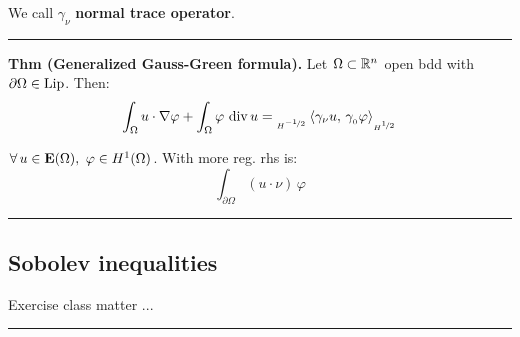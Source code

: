 We call $\gamma_\nu$ \textbf{normal trace operator}.

\begin{Figure}
\end{Figure}

\rule{0.31\textwidth}{0.2pt}

\textbf{Thm (Generalized Gauss-Green formula).} Let $\Omega\subset\mathbb{R}^n$ open bdd with $\partial\Omega\in\operatorname{Lip}$. Then:
\begin{equation*}
\int_\Omega u\cdot\nabla\varphi+\int_\Omega\varphi\,\operatorname{div} u={}_{_{H^{\nicefrac{-1}{2}}}}\left\langle \gamma_\nu u,\,\gamma_{_0}\varphi \right\rangle_{_{H^{\nicefrac{1}{2}}}}
\end{equation*}

$\forall\, u\in\mathbf{E}(\Omega),\ \varphi\in H^1(\Omega)$. With more reg. rhs is:
\begin{equation*}
\int_{\partial\Omega} (u\cdot\nu)\,\varphi
\end{equation*}

\rule{0.31\textwidth}{0.2pt}


\subsection{\color{red}Sobolev inequalities}


Exercise class matter ...







\rule{0.31\textwidth}{1pt}

\newcolumn










